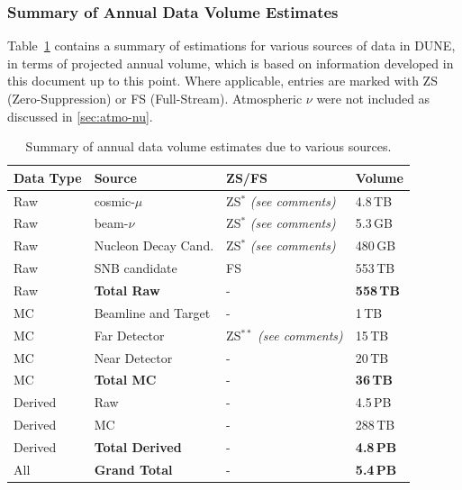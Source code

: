 \subsubsection{Summary of Annual Data Volume Estimates}
Table~\ref{tab:summary-data-table} contains a summary of estimations for various sources
of data in DUNE, in terms of projected annual volume, which is based on information developed in
this document up to this point. Where applicable, entries are marked with ZS (Zero-Suppression) or
FS (Full-Stream). Atmospheric $\nu$ were not included as discussed in \ref{sec:atmo-nu}.
\begin{table}[ht!]
	\centering
	\begin{tabular}{| p{1.5in}| p{1.75in} | p{1.5in} | p{1.0in} |}
		\hline
		\textbf{Data Type} & \textbf{Source} & \textbf{ZS/FS} & \textbf{Volume} \\ \hline
		Raw & cosmic-$\mu$  & ZS$^*$ \textit{(see comments)}& 4.8\,TB \\	\hline
		Raw & beam-$\nu$  & ZS$^*$ \textit{(see comments)}& 5.3\,GB  \\	\hline
		Raw & Nucleon Decay Cand.  & ZS$^*$ \textit{(see comments)}& 480\,GB  \\	\hline
		Raw & SNB candidate & FS & 553\,TB \\	\hline \hline \hline
		Raw & \textbf{Total Raw} & - & \textbf{558\,TB} \\		\hline \hline \hline
		MC & Beamline and Target  & - & 1\,TB \\	\hline
		MC & Far Detector & ZS$^{**}$  \textit{(see comments)}  & 15\,TB \\		\hline
		MC & Near Detector & - &20\,TB \\ \hline \hline \hline
		MC & \textbf{Total MC} & - & \textbf{36\,TB} \\		\hline \hline \hline
		Derived &  Raw  & - & 4.5\,PB \\	\hline
		Derived &  MC  & - & 288\,TB \\	\hline  \hline \hline
		Derived & \textbf{Total Derived} & - & \textbf{4.8\,PB} \\		\hline \hline \hline
		All & \textbf{Grand Total} & - & \textbf{5.4\,PB} \\		\hline %
	\end{tabular}
	\caption{Summary of annual data volume estimates due to various sources.}
	\label{tab:summary-data-table}
\end{table}
